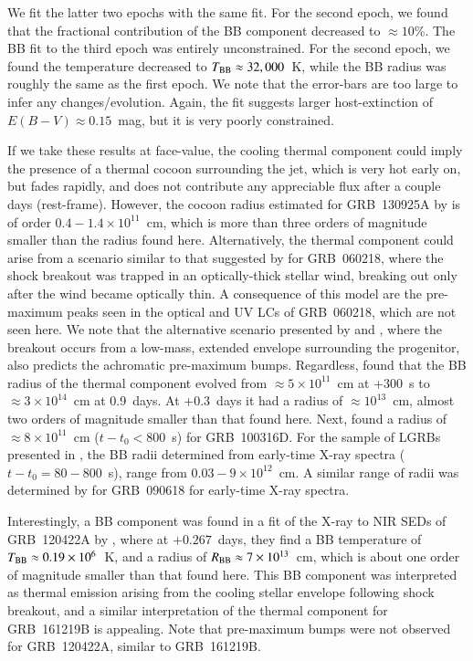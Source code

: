 \documentclass[traditabstract,longauth]{aa}
\begin{document}
We fit the latter two epochs with the same fit.  For the second epoch, we found that the fractional contribution of the BB component decreased to $\approx10$\%.  The BB fit to the third epoch was entirely unconstrained.  For the second epoch, we found the temperature decreased to $T_{\rm BB} \approx 32,000$~K, while the BB radius was roughly the same as the first epoch.  We note that the error-bars are too large to infer any changes/evolution.  Again, the fit suggests larger host-extinction of $E(B-V)\approx 0.15$~mag, but it is very poorly constrained.  %

 

If we take these results at face-value, the cooling thermal component could imply the presence of a thermal cocoon surrounding the jet, which is very hot early on, but fades rapidly, and does not contribute any appreciable flux after a couple days (rest-frame). However, the cocoon radius estimated for GRB~130925A by \citet{Piro14} is of order $0.4-1.4\times10^{11}$~cm, which is more than three orders of magnitude smaller than the radius found here. Alternatively, the thermal component could arise from a scenario similar to that suggested by \citet{Campana06} for GRB~060218, where the shock breakout was trapped in an optically-thick stellar wind, breaking out only after the wind became optically thin.  A consequence of this model are the pre-maximum peaks seen in the optical and UV LCs of GRB~060218, which are not seen here. We note that the alternative scenario presented by \citet{Margutti15} and \citet{Nakar15}, where the breakout occurs from a low-mass, extended envelope surrounding the progenitor, also predicts the achromatic pre-maximum bumps.  Regardless, \cite{Campana06} found that the BB radius of the thermal component evolved from $\approx5\times10^{11}$~cm at +300~s to $\approx3\times10^{14}$~cm at 0.9~days.  At +0.3~days it had a radius of $\approx10^{13}$~cm, almost two orders of magnitude smaller than that found here.  Next, \citet{Starling11} found a radius of $\approx 8\times10^{11}$~cm ($t-t_0<800$~s) for GRB~100316D.  For the sample of LGRBs presented in \citet{Starling12}, the BB radii determined from early-time X-ray spectra ($t-t_0=80-800$~s), range from $0.03-9\times10^{12}$~cm.  A similar range of radii was determined by \citet{Page11} for GRB~090618 for early-time X-ray spectra.

Interestingly, a BB component was found in a fit of the X-ray to NIR SEDs of GRB~120422A by \citet{Schulze14}, where at $+0.267$~days, they find a BB temperature of $T_{\rm BB} \approx 0.19\times10^{6}$~K, and a radius of $R_{\rm BB} \approx 7\times10^{13}$~cm, which is about one order of magnitude smaller than that found here.  This BB component was interpreted as thermal emission arising from the cooling stellar envelope following shock breakout, and a similar interpretation of the thermal component for GRB~161219B is appealing.  Note that pre-maximum bumps were not observed for GRB~120422A, similar to GRB~161219B.
\end{document}
